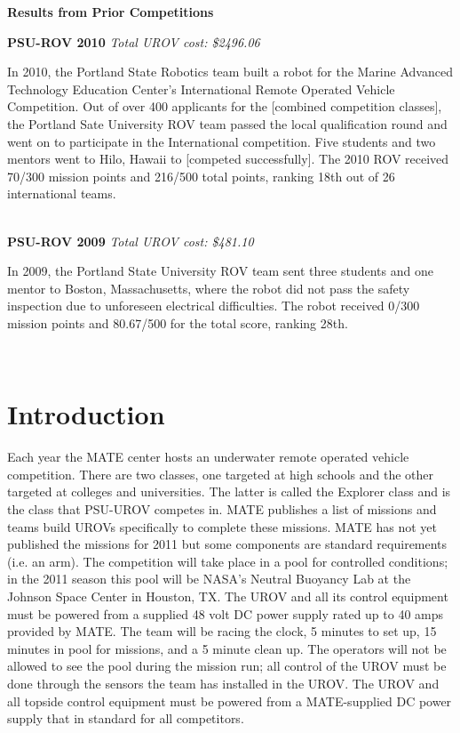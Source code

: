 \documentclass{proposalnsf}
\begin{document}
\centerline{\bf Results from Prior Competitions}

\noindent
{\bf PSU-ROV 2010}
{\it Total UROV cost: \$2496.06}

In 2010, the Portland State Robotics team built a robot for the Marine Advanced Technology Education Center's International Remote Operated Vehicle Competition. Out of over 400 applicants for the [combined competition classes], the Portland Sate University ROV team passed the local qualification round and went on to participate in the International competition. 
Five students and two mentors went to Hilo, Hawaii to [competed successfully]. The 2010 ROV received 70/300 mission points and 216/500 total points, 
ranking 18th out of 26 international teams.

\ \\
\noindent
{\bf PSU-ROV 2009}
{\it Total UROV cost: \$481.10}

In 2009, the Portland State University ROV team sent three students and one mentor to Boston, Massachusetts, where the robot did not pass the safety inspection 
due to unforeseen electrical difficulties.  The robot received 0/300 mission points and 80.67/500 for the total score, ranking 28th. 


\ \\

\section{Introduction}

Each year the MATE center hosts an underwater remote operated vehicle competition. There are two classes, one targeted at high schools and 
the other targeted at colleges and universities. The latter is called the Explorer class and is the class that PSU-UROV competes in. MATE 
publishes a list of missions and teams build UROVs specifically to complete these missions. MATE has not yet published the missions for 2011 
but some components are standard requirements (i.e. an arm). The competition will take place in a pool for controlled conditions; in the 2011 
season this pool will be NASA's Neutral Buoyancy Lab at the Johnson Space Center in Houston, TX. The UROV and all its control equipment 
must be powered from a supplied 48 volt DC power supply rated up to 40 amps provided by MATE. The team will be racing the clock, 
5 minutes to set up, 15 minutes in pool for missions, and a 5 minute clean up. The operators will not be allowed to see the pool during the mission run; all 
control of the UROV must be done through the sensors the team has installed in the UROV. The UROV and all topside control equipment must be 
powered from a MATE-supplied DC power supply that in standard for all competitors. 
\end{document}
